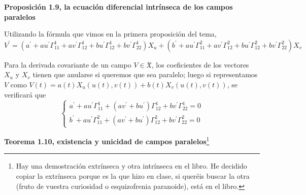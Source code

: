 \documentclass[openany]{book}
\begin{document}
\begin{center}
\textbf{Proposición 1.9, la ecuación diferencial intrínseca de los campos paralelos}
\end{center}
\begin{demonstration}

  Utilizando la fórmula que vimos en la primera proposición del tema,
  $$
  V^{\prime}=\left(a^{\prime}+a u^{\prime} \Gamma_{11}^{1}+a v^{\prime} \Gamma_{12}^{1}+b u^{\prime} \Gamma_{12}^{1}+b v^{\prime} \Gamma_{22}^{1}\right) X_{u} + \left(b^{\prime}+a u^{\prime} \Gamma_{11}^{2}+a v^{\prime} \Gamma_{12}^{2}+b u^{\prime} \Gamma_{12}^{2}+b v^{\prime} \Gamma_{22}^{2}\right) X_{v}
  $$

  Para la derivada covariante de un campo $V \in  \mathfrak{X}$, los coeficientes de los vectores $X_u$ y $X_v$ tienen que anularse si queremos que sea paralelo; luego si representamos $V$ como $V(t)=a(t) X_{u}(u(t), v(t))+b(t) X_{v}(u(t), v(t))$, se verificará que
$$
\left\{\begin{array}{l}
a^{\prime}+a u^{\prime} \Gamma_{11}^{1}+\left(a v^{\prime}+b u^{\prime}\right) \Gamma_{12}^{1}+b v^{\prime} \Gamma_{22}^{1}=0 \\
b^{\prime}+a u^{\prime} \Gamma_{11}^{2}+\left(a v^{\prime}+b u^{\prime}\right) \Gamma_{12}^{2}+b v^{\prime} \Gamma_{22}^{2}=0
\end{array}\right.
$$

\end{demonstration}
\newpage
\begin{center}
\textbf{Teorema 1.10, existencia y unicidad de campos paralelos}\footnote{Hay una demostración extrínseca y otra intrínseca en el libro. He decidido copiar la extrínseca porque es la que hizo en clase, si queréis buscar la otra (fruto de vuestra curiosidad o esquizofrenia paranoide), está en el libro.}
\end{center}
\end{document}

